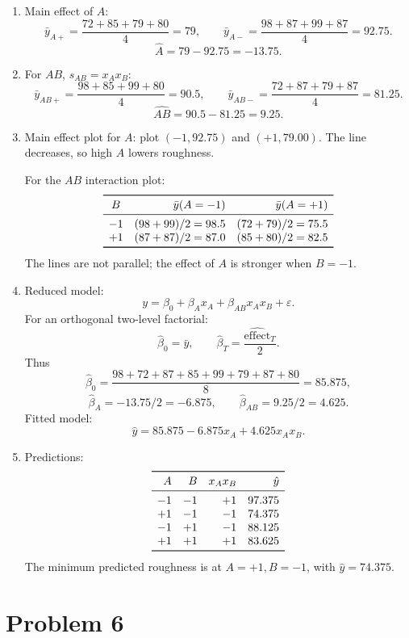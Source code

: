 \documentclass[11pt]{article}
\begin{document}
\begin{enumerate}[label=(\alph*)]
\item Main effect of \(A\):
\[
\bar y_{A+}=\frac{72+85+79+80}{4}=79,\qquad
\bar y_{A-}=\frac{98+87+99+87}{4}=92.75.
\]
\[
\hat A=79-92.75=-13.75.
\]

\item For \(AB\), \(s_{AB}=x_Ax_B\):
\[
\bar y_{AB+}=\frac{98+85+99+80}{4}=90.5,\qquad
\bar y_{AB-}=\frac{72+87+79+87}{4}=81.25.
\]
\[
\widehat{AB}=90.5-81.25=9.25.
\]

\item Main effect plot for \(A\): plot \((-1,92.75)\) and \((+1,79.00)\). The line decreases, so high \(A\) lowers roughness.

For the \(AB\) interaction plot:
\[
\begin{array}{crr}
\toprule
B & \bar y(A=-1) & \bar y(A=+1)\\
\midrule
-1 & (98+99)/2=98.5 & (72+79)/2=75.5\\
+1 & (87+87)/2=87.0 & (85+80)/2=82.5\\
\bottomrule
\end{array}
\]
The lines are not parallel; the effect of \(A\) is stronger when \(B=-1\).

\item Reduced model:
\[
y=\beta_0+\beta_Ax_A+\beta_{AB}x_Ax_B+\varepsilon.
\]
For an orthogonal two-level factorial:
\[
\hat\beta_0=\bar y,\qquad \hat\beta_T=\frac{\widehat{\text{effect}}_T}{2}.
\]
Thus
\[
\hat\beta_0=\frac{98+72+87+85+99+79+87+80}{8}=85.875,
\]
\[
\hat\beta_A=-13.75/2=-6.875,\qquad
\hat\beta_{AB}=9.25/2=4.625.
\]
Fitted model:
\[
\hat y=85.875-6.875x_A+4.625x_Ax_B.
\]

\item Predictions:
\[
\begin{array}{rrrr}
\toprule
A & B & x_Ax_B & \hat y\\
\midrule
-1 & -1 & +1 & 97.375\\
+1 & -1 & -1 & 74.375\\
-1 & +1 & -1 & 88.125\\
+1 & +1 & +1 & 83.625\\
\bottomrule
\end{array}
\]
The minimum predicted roughness is at \(A=+1,B=-1\), with \(\hat y=74.375\).
\end{enumerate}

\section*{Problem 6}
\end{document}
